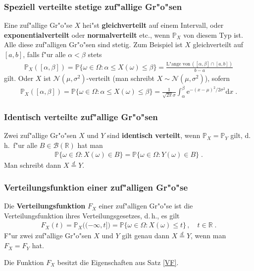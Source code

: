 \documentclass[ngerman,draft,parskip=half,twoside]{scrartcl}
\newcommand*{\R}{\mathbb{R}}      %
\newcommand*{\BorelM}{\mathcal{B}}  %
\newcommand*{\WKM}{\mathbb{P}}      %
\begin{document}
\subsubsection{Speziell verteilte stetige zuf"allige Gr"o"sen}
Eine zuf"allige Gr"o"se $X$ hei"st \textbf{gleichverteilt} auf einem Intervall,
oder \textbf{exponentialverteilt} oder \textbf{normalverteilt} etc., wenn $\WKM_X$ von diesem Typ
ist.
Alle diese zuf"alligen Gr"o"sen sind stetig.
Zum Beispiel ist $X$ gleichverteilt auf $[a,b]$, falls f"ur alle $\alpha<\beta$
stets
\begin{gather*}
  \WKM_X([\alpha,\beta])=\WKM\{\omega\in \Omega \colon \alpha\le X(\omega)\le \beta\}
     =\frac{\mbox{L"ange von}\, ([\alpha,\beta]\cap[a,b])}{b-a}
\end{gather*}
gilt. Oder $X$ ist $\mathcal N(\mu,\sigma^2)$-verteilt (man schreibt $X\sim \mathcal N(\mu,\sigma^2)$),
sofern
\begin{gather*}
  \WKM_X([\alpha,\beta])=\WKM\{\omega\in \Omega \colon \alpha\le X(\omega)\le \beta\}=
     \frac{1}{\sqrt{2\pi}\sigma}\int_\alpha^\beta \mathrm e^{-(x-\mu)^2/2\sigma^2}\mathrm d x\;.
\end{gather*}
\subsubsection{Identisch verteilte zuf"allige Gr"o"sen}
Zwei zuf"allige Gr"o"sen $X$ und $Y$ sind \textbf{identisch verteilt}, wenn $\WKM_X=\WKM_Y$ gilt,
d.\,h.~f"ur alle $B\in\BorelM(\R)$ hat man
\begin{gather*}
  \WKM\{\omega\in \Omega \colon X(\omega)\in B\}= \WKM\{\omega\in \Omega \colon Y(\omega)\in B\}\;.
\end{gather*}
Man schreibt dann $X\stackrel{d}{=}Y$.
\subsubsection{Verteilungsfunktion einer zuf"alligen Gr"o"se}
Die \textbf{Verteilungsfunktion} $F_X$ einer zuf"alligen Gr"o"se ist die Verteilungsfunktion
ihres Verteilungsgesetzes, d.\,h., es gilt
\begin{gather*}
  F_X(t)=\WKM_X\big((-\infty,t]\big)=\WKM\{\omega\in\Omega \colon X(\omega)\le t\}\,,\quad t\in \R\;.
\end{gather*}
F"ur zwei zuf"allige Gr"o"sen $X$ und $Y$ gilt genau dann $X\stackrel{d}{=}Y$, wenn man
$F_X=F_Y$ hat.

Die Funktion $F_X$ besitzt die Eigenschaften aus Satz \ref{VF}.
\end{document}
